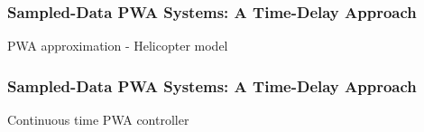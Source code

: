 \documentclass{beamer}
\begin{document}
\frame
  {  
    \frametitle{Sampled-Data PWA Systems: A Time-Delay Approach}
\centerline{}
\centerline{PWA approximation - Helicopter model}
}

\frame
  {  
  \frametitle{Sampled-Data PWA Systems: A Time-Delay Approach}
\centerline{}
\centerline{Continuous time PWA controller}    
}
\end{document}
